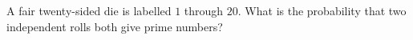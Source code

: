 A fair twenty-sided die is labelled $1$ through $20$. What is the probability that two independent rolls both give prime numbers?
